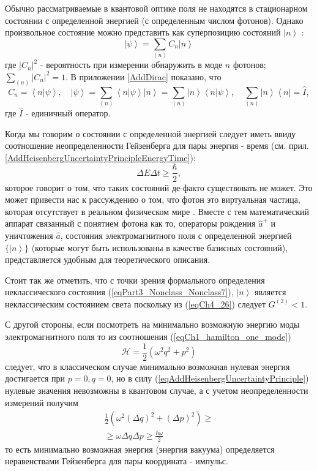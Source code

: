 Обычно рассматриваемые в квантовой оптике поля не находятся в
стационарном состоянии с определенной энергией (с определенным числом
фотонов). Однако произвольное состояние можно представить как
суперпозицию состояний $\left|n\right>$ : 
\begin{equation}
\left|\psi\right> = \sum_{(n)} C_n \left|n\right>
\end{equation}
где $\left|C_n\right|^2$ - вероятность при измерении обнаружить в моде
$n$ фотонов; $\sum_{(n)} \left|C_n\right|^2 = 1$. 
В приложении \ref{AddDirac} показано, что
\[
C_n = \left< n \right.\left| \psi \right>, \quad
\left| \psi \right> = \sum_{(n)} \left< n \right.\left| \psi \right>
\left| n \right> =
\sum_{(n)} \left| n \right>\left< n \right.\left| \psi \right>,
\quad
\sum_{(n)} \left| n \right>\left< n \right| = \hat{I},
\]
где $\hat{I}$ - единичный оператор.

\begin{remark}
  Когда мы говорим о состоянии с определенной энергией следует иметь
  ввиду соотношение неопределенности Гейзенберга для пары
  энергия - время
  (см. прил. \ref{AddHeisenbergUncertaintyPrincipleEnergyTime}): 
  \[
  \Delta E \Delta t \ge \frac{\hbar}{2},
  \]
  которое говорит о том, что таких состояний де-факто существовать не
  может. Это может привести нас к рассуждению о том, что фотон это
  виртуальная частица, которая отсутствует в реальном физическом мире
  \cite{Lamb1995}. Вместе с тем математический аппарат связанный с
  понятием фотона как то, операторы рождения $\hat{a}^{+}$ и
  уничтожения $\hat{a}$, состояния электромагнитного поля с
  определенной энергией $\{\left|n\right>\}$ (которые могут быть
  использованы в качестве базисных состояний), представляется удобным
  для теоретического описания.

  Стоит так же отметить, что с точки зрения формального определения
  неклассического состояния (\ref{eqPart3_Nonclass_Nonclass7}),
  $\left|n\right>$ является неклассическим 
  состоянием света поскольку из (\ref{eqCh4_26}) следует $G^{(2)} <
  1$.

  С другой стороны, если посмотреть на минимально возможную энергию
  моды электромагнитного поля то из соотношения
  (\ref{eqCh1_hamilton_one_mode}) 
  \[
  \mathcal{H} = \frac{1}{2}\left(\omega^2 q^2 + p^2\right)
  \]
  следует, что в классическом случае минимально возможная нулевая
  энергия достигается при $p = 0, q=0$, но в силу
  (\ref{eqAddHeisenbergUncertaintyPrinciple}) нулевые значения
  невозможны в квантовом случае, а с учетом неопределенности измерений
  получим 
  \begin{eqnarray}
    \frac{1}{2}\left(\omega^2 (\Delta q)^2 + (\Delta p)^2\right) \ge
    \nonumber \\
    \ge \omega \Delta q \Delta p \ge \frac{\hbar \omega}{2}
    \nonumber
  \end{eqnarray}
  то есть минимально возможная энергия (энергия вакуума) определяется
  неравенствами Гейзенберга для пары координата - импульс.  
  \label{rem:antiphoton}
\end{remark}
